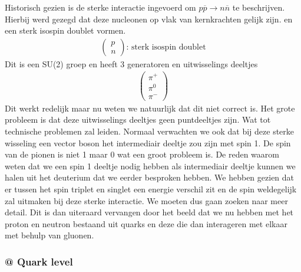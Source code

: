 \documentclass[../main.tex]{subfiles}
\begin{document}
Historisch gezien is de sterke interactie ingevoerd om $p\overline p \rightarrow n\overline n$ te beschrijven. Hierbij werd gezegd dat deze nucleonen op vlak van kernkrachten gelijk zijn. en een sterk isospin doublet vormen.
\begin{equation}
    \begin{aligned}
        \label{eq:nucleon_doublet}
        \begin{pmatrix}
            p\\
            n
        \end{pmatrix}
        \text{: sterk isospin doublet}
    \end{aligned}
\end{equation}
Dit is een SU(2) groep en heeft 3 generatoren en uitwisselings deeltjes
\begin{equation}
    \begin{aligned}
        \label{eq:isospin_uitwisseling_deeltjes}
        \begin{pmatrix}
            \pi^+\\
            \pi^0\\
            \pi^-
        \end{pmatrix}
    \end{aligned}
\end{equation}
Dit werkt redelijk maar nu weten we natuurlijk dat dit niet correct is. Het grote probleem is dat deze uitwisselings deeltjes geen puntdeeltjes zijn. Wat tot technische problemen zal leiden. Normaal verwachten we ook dat bij deze sterke wisseling een vector boson het intermediair deeltje zou zijn met spin 1. De spin van de pionen is niet 1 maar 0 wat een groot probleem is. De reden waarom weten dat we een spin 1 deeltje nodig hebben als intermediair deeltje kunnen we halen uit het deuterium dat we eerder besproken hebben. We hebben gezien dat er tussen het spin triplet en singlet een energie verschil zit en de spin weldegelijk zal uitmaken bij deze sterke interactie. We moeten dus gaan zoeken naar meer detail. Dit is dan uiteraard vervangen door het beeld dat we nu hebben met het proton en neutron bestaand uit quarks en deze die dan interageren met elkaar met behulp van gluonen.

\subsubsection{@ Quark level}%
\label{ssub:_quark_level}
\end{document}
